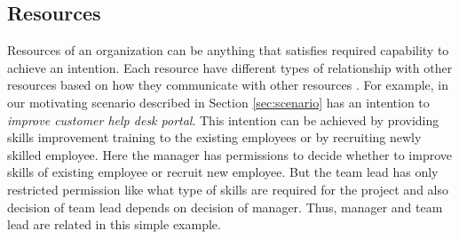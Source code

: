 \subsection{Resources} 
\label{sec:resources}
Resources of an organization can be anything that satisfies required capability to achieve an intention. Each resource have different types of relationship with other resources based on how they communicate with other resources \cite{Sungur2015}. For example, in our motivating scenario described in Section \ref{sec:scenario} has an intention to \textit{improve customer help desk portal}. This intention can be achieved by providing skills improvement training to the existing employees or by recruiting newly skilled employee. Here the manager has permissions to decide whether to improve skills of existing employee or recruit new employee. But the team lead has only restricted permission like what type of skills are required for the project and also decision of team lead depends on decision of manager. Thus, manager and team lead are related in this simple example. 
